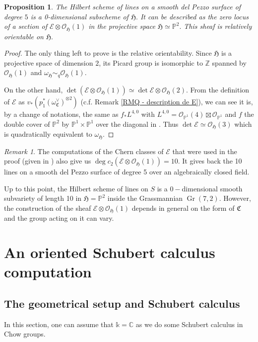 \documentclass{amsart}
\theoremstyle{plain}%
\newtheorem{prop}[subsubsection]{Proposition}
\theoremstyle{remark}
\newtheorem{rmq}[subsubsection]{Remark}
\theoremstyle{definition}
\newcommand{\cE}{\mathcal{E}}
\newcommand{\cO}{\mathcal{O}}
\newcommand{\eC}{\mathbb{C}}
\newcommand{\ek}{\mathbb{k}}
\newcommand{\eP}{\mathbb{P}}
\newcommand{\eZ}{\mathbb{Z}}
\newcommand{\fC}{\mathfrak{C}}
\newcommand{\fH}{\mathfrak{H}}
\newcommand{\simquad}{\sim_q}
\newcommand{\Grass}{\operatorname{Gr}}
\begin{document}
\begin{prop}
The Hilbert scheme of lines on a smooth del Pezzo surface of degree $5$ is a 0-dimensional subscheme of $\fH.$ It can be described as the zero locus of a section of $\cE\otimes\cO_\fH(1)$ in the projective space $\fH \simeq \eP^2.$ This sheaf is relatively orientable on $\fH.$
\end{prop}

\begin{proof}
The only thing left to prove is the relative orientability. Since $\fH$ is a projective space of dimension $2$, its Picard group is isomorphic to $\eZ$ spanned by $\cO_\fH(1)$ and $\omega_\fH \simquad \cO_\fH(1).$

On the other hand, $\det(\cE\otimes \cO_\fH(1)) \simeq \det\cE \otimes \cO_\fH(2).$ From the definition of $\cE$ as $v_\ast (p_1^\ast(\omega_\fC^\vee)^{\otimes 2})$ (c.f. Remark \ref{RMQ - description de E}), we can see it is, by a change of notations, the same as $f_\ast L^{4,0} $ with $L^{4,0} = \cO_{\eP^1}(4)\boxtimes \cO_{\eP^1}$ and $f$ the double cover of $\eP^2$ by $\eP^1\times \eP^1$ over the diagonal in \cite[Theorem 5]{Schwarzenberger}. Thus $\det \cE \simeq \cO_\fH(3)$ which is quadratically equivalent to $\omega_\fH.$
\end{proof}

\begin{rmq}\label{RMQ - classe chern fibre des droites}
The computations of the Chern classes of $\cE$ that were used in the proof (given in \cite[Theorem 5]{Schwarzenberger}) also give us $\deg c_2(\cE\otimes \cO_\fH(1)) = 10$. It gives back the 10 lines on a smooth del Pezzo surface of degree 5 over an algebraically closed field.
\end{rmq}

Up to this point, the Hilbert scheme of lines on $S$ is a $0-$dimensional smooth subvariety of length 10 in $\fH = \eP^2$ inside the Grassmannian $\Grass(7,2).$ However, the construction of the sheaf $\cE\otimes \cO_\fH(1)$ depends in general on the form of $\fC$ and the group acting on it can vary. 

\section{An oriented Schubert calculus computation}\label{SEC - calcul Schubert oriente}

\subsection{The geometrical setup and Schubert calculus}
In this section, one can assume that $\ek = \eC$ as we do some Schubert calculus in Chow groups.
\end{document}
